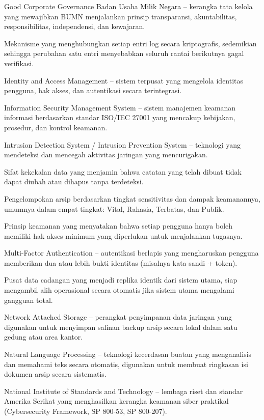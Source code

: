 \documentclass[12pt,a4paper]{report}
\begin{document}
{\begin{description}[leftmargin=2.5cm, style=nextline]
    \item[GCG BUMN] Good Corporate Governance Badan Usaha Milik Negara -- kerangka tata kelola yang mewajibkan BUMN menjalankan prinsip transparansi, akuntabilitas, responsibilitas, independensi, dan kewajaran.
    \item[Hash Chain] Mekanisme yang menghubungkan setiap entri log secara kriptografis, sedemikian sehingga perubahan satu entri menyebabkan seluruh rantai berikutnya gagal verifikasi.
    \item[IAM] Identity and Access Management -- sistem terpusat yang mengelola identitas pengguna, hak akses, dan autentikasi secara terintegrasi.
    \item[ISMS] Information Security Management System -- sistem manajemen keamanan informasi berdasarkan standar ISO/IEC 27001 yang mencakup kebijakan, prosedur, dan kontrol keamanan.
    \item[IDS/IPS] Intrusion Detection System / Intrusion Prevention System -- teknologi yang mendeteksi dan mencegah aktivitas jaringan yang mencurigakan.
    \item[Immutability] Sifat kekekalan data yang menjamin bahwa catatan yang telah dibuat tidak dapat diubah atau dihapus tanpa terdeteksi.
    \item[Klasifikasi Arsip] Pengelompokan arsip berdasarkan tingkat sensitivitas dan dampak keamanannya, umumnya dalam empat tingkat: Vital, Rahasia, Terbatas, dan Publik.
    \item[\textit{Least Privilege}] Prinsip keamanan yang menyatakan bahwa setiap pengguna hanya boleh memiliki hak akses minimum yang diperlukan untuk menjalankan tugasnya.
    \item[MFA] Multi-Factor Authentication -- autentikasi berlapis yang mengharuskan pengguna memberikan dua atau lebih bukti identitas (misalnya kata sandi + token).
    \item[Mirror Site] Pusat data cadangan yang menjadi replika identik dari sistem utama, siap mengambil alih operasional secara otomatis jika sistem utama mengalami gangguan total.
    \item[NAS] Network Attached Storage -- perangkat penyimpanan data jaringan yang digunakan untuk menyimpan salinan backup arsip secara lokal dalam satu gedung atau area kantor.
    \item[NLP] Natural Language Processing -- teknologi kecerdasan buatan yang menganalisis dan memahami teks secara otomatis, digunakan untuk membuat ringkasan isi dokumen arsip secara sistematis.
    \item[NIST] National Institute of Standards and Technology -- lembaga riset dan standar Amerika Serikat yang menghasilkan kerangka keamanan siber praktikal (Cybersecurity Framework, SP 800-53, SP 800-207).

\end{description}}
\end{document}
